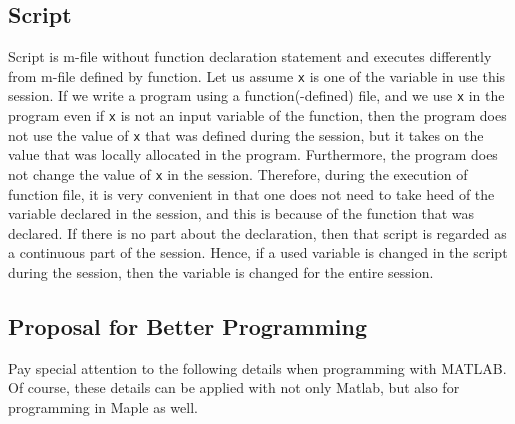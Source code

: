 \subsection{Script}
Script is m-file without function declaration statement and executes differently from m-file defined by function. Let us assume {\tt x} is one of the variable in use this session. If we write a program using a function(-defined) file, and we use {\tt x} in the program even if {\tt x} is not an input variable of the function, then the program does not use the value of {\tt x} that was defined during the session, but it takes on the value that was locally allocated in the program. Furthermore, the program does not change the value of {\tt x} in the session. Therefore, during the execution of function file, it is very convenient in that one does not need to take heed of the variable declared in the session, and this is because of the function that was declared. If there is no part about the declaration, then that script is regarded as a continuous part of the session. Hence, if a used variable is changed in the script during the session, then the variable is changed for the entire session.

\subsection{Proposal for Better Programming}
Pay special attention to the following details when programming with MATLAB. Of course, these details can be applied with not only Matlab, but also for programming in Maple as well.

